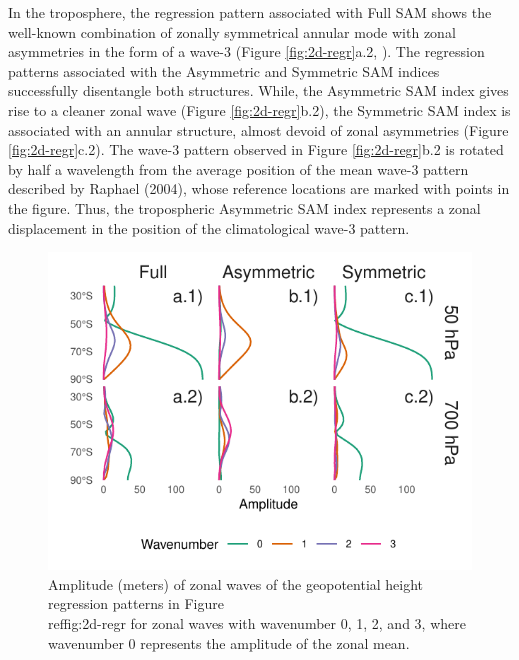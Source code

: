 \documentclass[smallextended]{svjour3}       %
\begin{document}
In the troposphere, the regression pattern associated with Full SAM shows the well-known combination of zonally symmetrical annular mode with zonal asymmetries in the form of a wave-3 (Figure \ref{fig:2d-regr}a.2, \citep{fogt2012}). The regression patterns associated with the Asymmetric and Symmetric SAM indices successfully disentangle both structures. While, the Asymmetric SAM index gives rise to a cleaner zonal wave (Figure \ref{fig:2d-regr}b.2), the Symmetric SAM index is associated with an annular structure, almost devoid of zonal asymmetries (Figure \ref{fig:2d-regr}c.2). The wave-3 pattern observed in Figure \ref{fig:2d-regr}b.2 is rotated by half a wavelength from the average position of the mean wave-3 pattern described by Raphael (2004), whose reference locations are marked with points in the figure. Thus, the tropospheric Asymmetric SAM index represents a zonal displacement in the position of the climatological wave-3 pattern.

\begin{figure}
\includegraphics{wave-amplitude-1} \caption{Amplitude (meters) of zonal waves of the geopotential height regression patterns in Figure \\ref{fig:2d-regr} for zonal waves with wavenumber 0, 1, 2, and 3, where wavenumber 0 represents the amplitude of the zonal mean.}\label{fig:wave-amplitude}
\end{figure}
\end{document}
